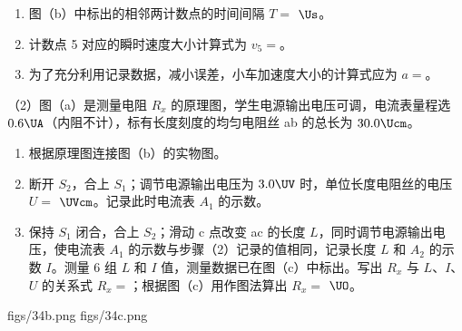 \documentclass[\gkver]{gaokaozhenti}
\begin{document}
\begin{enumerate}
\begin{enumerate}
	（C）将小车停靠在打点计时器附近，小车尾部与纸带相连。

	（D）把打点计时器固定在平板上，让纸带穿过限位孔。

	上述实验步骤的正确顺序是：（用字母填写）。

	\item
	图（b）中标出的相邻两计数点的时间间隔 $T=$ $\Us$。

	\item
	计数点 5 对应的瞬时速度大小计算式为 $v_{5}=$。

	\item
	为了充分利用记录数据，减小误差，小车加速度大小的计算式应为 $a=$。
\end{enumerate}


（2）图（a）是测量电阻 $R_{x}$ 的原理图，学生电源输出电压可调，电流表量程选 $0.6\UA$（内阻不计），标有长度刻度的均匀电阻丝 ab 的总长为 $30.0\Ucm$。
\begin{enumerate}
	\item
	根据原理图连接图（b）的实物图。

	\item
	断开 $S_{2}$，合上 $S_{1}$；调节电源输出电压为 $3.0\UV$ 时，单位长度电阻丝的电压 $U=$ $\UVcm$。记录此时电流表 $A_{1}$ 的示数。

	\item
	保持 $S_{1}$ 闭合，合上 $S_{2}$；滑动 c 点改变 ac 的长度 $L$，同时调节电源输出电压，使电流表 $A_{1}$ 的示数与步骤（2）记录的值相同，记录长度 $L$ 和 $A_{2}$ 的示数 $I$。测量 6 组 $L$ 和 $I$ 值，测量数据已在图（c）中标出。写出 $R_{x}$ 与 $L$、$I$、$U$ 的关系式 $R_{x}=$；根据图（c）用作图法算出 $R_{x}=$ $\UO$。
\end{enumerate}

{figs/34b.png}
{figs/34c.png}

\end{enumerate}
\end{document}

